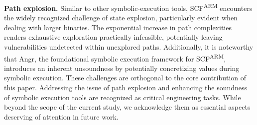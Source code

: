 \textbf{Path explosion.} Similar to other symbolic-execution tools, \gls{SCF}\textsuperscript{ARM} encounters the widely recognized challenge of state explosion, particularly evident when dealing with larger binaries. The exponential increase in path complexities renders exhaustive exploration practically infeasible, potentially leaving vulnerabilities undetected within unexplored paths. Additionally, it is noteworthy that Angr, the foundational symbolic execution framework for \gls{SCF}\textsuperscript{ARM}, introduces an inherent unsoundness by potentially concretizing values during symbolic execution. These challenges are orthogonal to the core contribution of this paper. Addressing the issue of path explosion and enhancing the soundness of symbolic execution tools are recognized as critical engineering tasks. While beyond the scope of the current study, we acknowledge them as essential aspects deserving of attention in future work.


